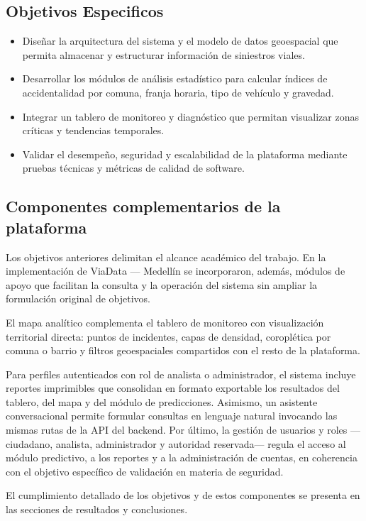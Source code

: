 \subsection{Objetivos Especificos}

\begin{itemize}
    \item Diseñar la arquitectura del sistema y el modelo de datos geoespacial que permita almacenar y estructurar información de siniestros viales.
    \item Desarrollar los módulos de análisis estadístico para calcular índices de accidentalidad por comuna, franja horaria, tipo de vehículo y gravedad.
    \item Integrar un tablero de monitoreo y diagnóstico que permitan visualizar zonas críticas y tendencias temporales.
    \item Validar el desempeño, seguridad y escalabilidad de la plataforma mediante pruebas técnicas y métricas de calidad de software.
\end{itemize}

\subsection{Componentes complementarios de la plataforma}

Los objetivos anteriores delimitan el alcance académico del trabajo. En la implementación de ViaData — Medellín se incorporaron, además, módulos de apoyo que facilitan la consulta y la operación del sistema sin ampliar la formulación original de objetivos.

El mapa analítico complementa el tablero de monitoreo con visualización territorial directa: puntos de incidentes, capas de densidad, coroplética por comuna o barrio y filtros geoespaciales compartidos con el resto de la plataforma.

Para perfiles autenticados con rol de analista o administrador, el sistema incluye reportes imprimibles que consolidan en formato exportable los resultados del tablero, del mapa y del módulo de predicciones. Asimismo, un asistente conversacional permite formular consultas en lenguaje natural invocando las mismas rutas de la API del backend. Por último, la gestión de usuarios y roles ---ciudadano, analista, administrador y autoridad reservada--- regula el acceso al módulo predictivo, a los reportes y a la administración de cuentas, en coherencia con el objetivo específico de validación en materia de seguridad.

El cumplimiento detallado de los objetivos y de estos componentes se presenta en las secciones de resultados y conclusiones.
